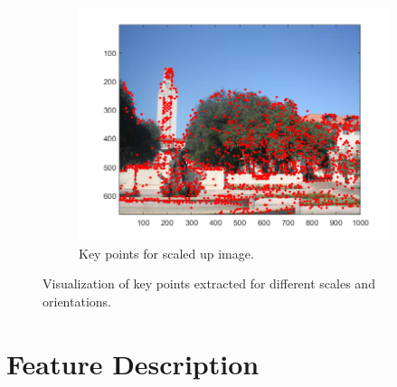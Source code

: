 \documentclass{article}
\begin{document}
\begin{figure}[!htb]
\begin{subfigure}{.9\textwidth}
  \includegraphics[width=.99\textwidth]{uttower2_scaledup_keypoints.png}
  \caption{Key points for scaled up image.}
\end{subfigure}
\caption{Visualization of key points extracted for different scales and orientations.}
\end{figure}

\newpage

\section{Feature Description}
\end{document}
